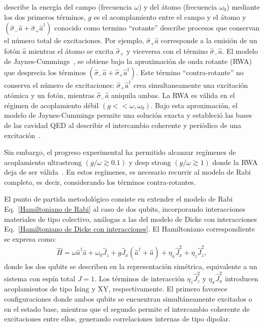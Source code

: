 \documentclass[onecolumn,notitlepage,letterpaper,aps,pra,12pt]{article}
\numberwithin{equation}{section}
\begin{document}
describe la energía del campo (frecuencia $\omega$) y del átomo (frecuencia $\omega_{0}$) mediante los dos primeros términos, $g$ es el acomplamiento entre el campo y el átomo y $(\hat{\sigma}_{-}\hat{a} + \hat{\sigma}_{+}\hat{a}^{\dagger})$ conocido como termino ``rotante'' describe procesos que conservan el número total de excitaciones. Por ejemplo, $\hat{\sigma}_{+}\hat{a}$ corresponde a la emisión de un fotón $\hat{a}$ mientras el átomo se excita $\hat{\sigma}_{+}$ y viceversa con el término $\hat{\sigma}_{-}\hat{a}$. El modelo de Jaynes-Cummings~\cite{Jaynes1963}, se obtiene bajo la aproximación de onda rotante (RWA) que desprecia los términos $(\hat{\sigma}_{-}\hat{a} + \hat{\sigma}_{+}\hat{a}^{\dagger})$. Este término  ``contra-rotante'' no conserva el número de excitaciones: $\hat{\sigma}_{+}\hat{a}^{\dagger}$ crea simultaneamente una excitación atómica y un fotón, mientras $\hat{\sigma}_{-}\hat{a}$ aniquila ambas. La RWA es válida en el régimen de acoplamiento débil $(g<<\omega,\omega_{0})$. Bajo esta aproximación, el modelo de Jaynes-Cummings permite una solución exacta y estableció las bases de las cavidad QED al describir el intercambio coherente y periódico de una excitación~\cite{wallraff2004,Schoelkopf2008,devoret2013}.

Sin embargo, el progreso experimental ha permitido alcanzar regímenes de acoplamiento ultrastrong $(g/\omega \gtrsim 0.1)$ y deep strong $(g/\omega \gtrsim 1)$ donde la RWA deja de ser válida~\cite{FornDiaz2019,Yoshihara2017}. En estos regímenes, es necesario recurrir al modelo de Rabi completo, es decir, considerando los términos contra-rotantes.

El punto de partida metodológico consiste en extender el modelo de Rabi Eq.~\eqref{Hamiltoniano de Rabi} al caso de dos qubits, incorporando interacciones materiales de tipo colectivo, análogas a las del modelo de Dicke con interacciones Eq.~\eqref{Hamiltoniano de Dicke con interacciones}. El Hamiltoniano correspondiente se expresa como:
\begin{gather}\label{Hamiltoniano de Rabi dos qubits con interacciones}
    \hat{H} = \omega \hat{a}^{\dagger}\hat{a} + \omega_{0} \hat{J}_{z} + g \hat{J}_{x} (\hat{a}^{\dagger} + \hat{a}) + \eta_{x} \hat{J}_{x}^{2} + \eta_{z} \hat{J}_{z}^{2},
\end{gather}
donde los dos qubits se describen en la representación simétrica, equivalente a un sistema con espín total $J=1$.  Los términos de interacción $\eta_{z}\hat{J}_{z}^{2}$ y $\eta_{x}\hat{J}_{x}^{2}$ introducen acoplamientos de tipo Ising y XY, respectivamente. El primero favorece configuraciones donde ambos qubits se encuentran simultáneamente excitados o en el estado base, mientras que el segundo permite el intercambio coherente de excitaciones entre ellos, generando correlaciones internas de tipo dipolar.
\end{document}
